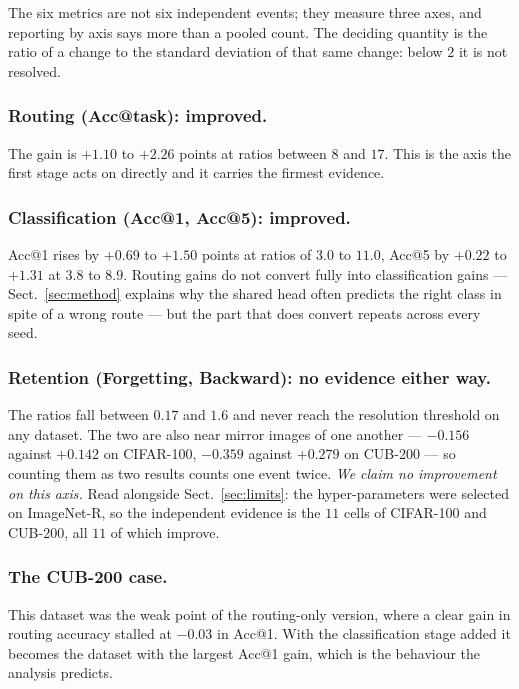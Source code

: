 \documentclass[runningheads]{llncs}
\begin{document}
The six metrics are not six independent events; they measure three axes, and
reporting by axis says more than a pooled count. The deciding quantity is the
ratio of a change to the standard deviation of that same change: below $2$ it is
not resolved.

\subsubsection{Routing (Acc@task): improved.}
The gain is $+1.10$ to $+2.26$ points at ratios between $8$ and $17$. This is
the axis the first stage acts on directly and it carries the firmest evidence.

\subsubsection{Classification (Acc@1, Acc@5): improved.}
Acc@1 rises by $+0.69$ to $+1.50$ points at ratios of $3.0$ to $11.0$, Acc@5 by
$+0.22$ to $+1.31$ at $3.8$ to $8.9$. Routing gains do not convert fully into
classification gains --- Sect.~\ref{sec:method} explains why the shared head
often predicts the right class in spite of a wrong route --- but the part that
does convert repeats across every seed.

\subsubsection{Retention (Forgetting, Backward): no evidence either way.}
The ratios fall between $0.17$ and $1.6$ and never reach the resolution
threshold on any dataset. The two are also near mirror images of one another
--- $-0.156$ against $+0.142$ on CIFAR-100, $-0.359$ against $+0.279$ on
CUB-200 --- so counting them as two results counts one event twice. \emph{We
claim no improvement on this axis.} Read alongside Sect.~\ref{sec:limits}: the
hyper-parameters were selected on ImageNet-R, so the independent evidence is the
$11$ cells of CIFAR-100 and CUB-200, all $11$ of which improve.

\subsubsection{The CUB-200 case.}
This dataset was the weak point of the routing-only version, where a clear gain
in routing accuracy stalled at $-0.03$ in Acc@1. With the classification stage
added it becomes the dataset with the largest Acc@1 gain, which is the behaviour
the analysis predicts.
\end{document}
